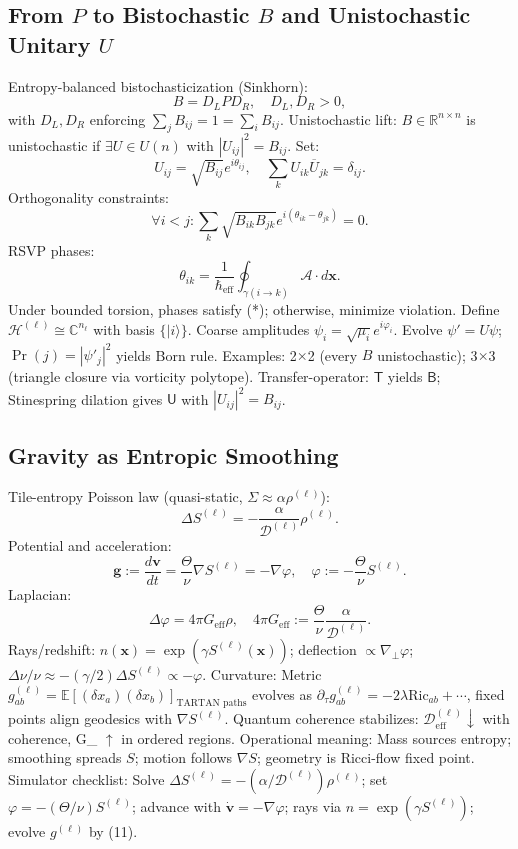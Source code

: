 \documentclass[11pt]{article}
\theoremstyle{plain}
\theoremstyle{definition}
\begin{document}
\subsection{From $P$ to Bistochastic $B$ and Unistochastic Unitary $U$}
Entropy-balanced bistochasticization (Sinkhorn):
\[
B = D_L P D_R, \quad D_L, D_R > 0,
\]
with $D_L, D_R$ enforcing $\sum_j B_{ij} = 1 = \sum_i B_{ij}$.
Unistochastic lift: $B \in \mathbb{R}^{n \times n}$ is unistochastic if $\exists U \in U(n)$ with $|U_{ij}|^2 = B_{ij}$. Set:
\[
U_{ij} = \sqrt{B_{ij}} e^{i \theta_{ij}}, \quad \sum_k U_{ik} \overline{U}_{jk} = \delta_{ij}.
\]
Orthogonality constraints:
\[
\forall i < j: \sum_k \sqrt{B_{ik} B_{jk}} e^{i (\theta_{ik} - \theta_{jk})} = 0. \tag{*}
\]
RSVP phases:
\[
\theta_{ik} = \frac{1}{\hbar_{\mathrm{eff}}} \oint_{\gamma(i \to k)} \mathcal{A} \cdot d\bm{x}.
\]
Under bounded torsion, phases satisfy (*); otherwise, minimize violation.
Define $\mathcal{H}^{(\ell)} \cong \mathbb{C}^{n_\ell}$ with basis $\{|i\rangle\}$. Coarse amplitudes $\psi_i = \sqrt{\mu_i} e^{i \varphi_i}$. Evolve $\psi' = U \psi$; $\Pr(j) = |\psi'_j|^2$ yields Born rule.
Examples: 2$\times$2 (every $B$ unistochastic); 3$\times$3 (triangle closure via vorticity polytope).
Transfer-operator: $\mathsf{T}$ yields $\mathsf{B}$; Stinespring dilation gives $\mathsf{U}$ with $|U_{ij}|^2 = B_{ij}$.
\subsection{Gravity as Entropic Smoothing}
Tile-entropy Poisson law (quasi-static, $\Sigma \approx \alpha \rho^{(\ell)}$):
\[
\Delta S^{(\ell)} = -\frac{\alpha}{\mathcal{D}^{(\ell)}} \rho^{(\ell)}.
\]
Potential and acceleration:
\[
\bm{g} := \frac{d \bm{v}}{dt} = \frac{\Theta}{\nu} \nabla S^{(\ell)} = -\nabla \varphi, \quad \varphi := -\frac{\Theta}{\nu} S^{(\ell)}.
\]
Laplacian:
\[
\Delta \varphi = 4\pi G_{\mathrm{eff}} \rho, \quad 4\pi G_{\mathrm{eff}} := \frac{\Theta}{\nu} \frac{\alpha}{\mathcal{D}^{(\ell)}}.
\]
Rays/redshift: $n(\bm{x}) = \exp(\gamma S^{(\ell)}(\bm{x}))$; deflection $\propto \nabla_\perp \varphi$; $\Delta \nu / \nu \approx -(\gamma / 2) \Delta S^{(\ell)} \propto - \varphi$.
Curvature: Metric $g_{ab}^{(\ell)} = \mathbb{E}[(\delta x_a)(\delta x_b)]_{\text{TARTAN paths}}$ evolves as $\partial_\tau g_{ab}^{(\ell)} = -2\lambda \mathrm{Ric}_{ab} + \cdots$, fixed points align geodesics with $\nabla S^{(\ell)}$.
Quantum coherence stabilizes: $\mathcal{D}^{(\ell)}_{\mathrm{eff}} \downarrow$ with coherence, G_{} $\uparrow$ in ordered regions.
Operational meaning: Mass sources entropy; smoothing spreads $S$; motion follows $\nabla S$; geometry is Ricci-flow fixed point.
Simulator checklist: Solve $\Delta S^{(\ell)} = -(\alpha / \mathcal{D}^{(\ell)}) \rho^{(\ell)}$; set $\varphi = -(\Theta / \nu) S^{(\ell)}$; advance with $\dot{\bm{v}} = -\nabla \varphi$; rays via $n = \exp(\gamma S^{(\ell)})$; evolve $g^{(\ell)}$ by (11).
\end{document}
